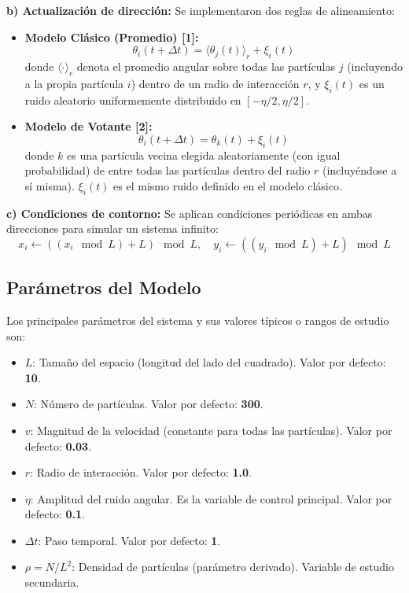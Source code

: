 \documentclass{article}
\begin{document}
\textbf{b) Actualización de dirección:}
Se implementaron dos reglas de alineamiento:
\begin{itemize}
\item \textbf{Modelo Clásico (Promedio) [1]:}
\begin{equation}
\theta_i(t + \Delta t) = \langle \theta_j(t) \rangle_{r} + \xi_i(t)
\label{eq:posicion}
\end{equation}
donde $\langle \cdot \rangle_{r}$ denota el promedio angular sobre todas las partículas $j$ (incluyendo a la propia partícula $i$) dentro de un radio de interacción $r$, y $\xi_i(t)$ es un ruido aleatorio uniformemente distribuido en $[-\eta/2, \eta/2]$.

\item \textbf{Modelo de Votante [2]:}
\begin{equation}
\theta_i(t + \Delta t) = \theta_k(t) + \xi_i(t)
\label{eq:posicion}
\end{equation}
donde $k$ es una partícula vecina elegida aleatoriamente (con igual probabilidad) de entre todas las partículas dentro del radio $r$ (incluyéndose a sí misma). $\xi_i(t)$ es el mismo ruido definido en el modelo clásico.
\end{itemize}

\textbf{c) Condiciones de contorno:} Se aplican condiciones periódicas en ambas direcciones para simular un sistema infinito:
\begin{equation}
x_i \leftarrow ((x_i \mod L) + L) \mod L, \quad y_i \leftarrow ((y_i \mod L) + L) \mod L
\label{eq:posicion}
\end{equation}

\subsection{Parámetros del Modelo}
Los principales parámetros del sistema y sus valores típicos o rangos de estudio son:
\begin{itemize}
\item $L$: Tamaño del espacio (longitud del lado del cuadrado). Valor por defecto: \textbf{10}.
\item $N$: Número de partículas. Valor por defecto: \textbf{300}.
\item $v$: Magnitud de la velocidad (constante para todas las partículas). Valor por defecto: \textbf{0.03}.
\item $r$: Radio de interacción. Valor por defecto: \textbf{1.0}.
\item $\eta$: Amplitud del ruido angular. Es la variable de control principal. Valor por defecto: \textbf{0.1}.
\item $\Delta t$: Paso temporal. Valor por defecto: \textbf{1}.
\item $\rho = N/L^2$: Densidad de partículas (parámetro derivado). Variable de estudio secundaria.
\end{itemize}
\end{document}
